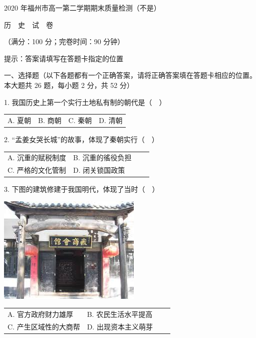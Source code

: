 \documentclass{ctexart}
\begin{document}
\begin{center}

\LARGE 2020 年福州市高一第二学期期末质量检测（不是）

\Huge \textsf{历　史　试　卷}

\bigskip

\normalsize（满分：100 分；完卷时间：90 分钟）

\medskip

\large \textsf{提示：答案请填写在答题卡指定的位置}

\end{center}

\textsf{一、选择题（以下各题都有一个正确答案，请将正确答案填在答题卡相应的位置。本大题共 26 题，每小题 2 分，共 52 分）}

1. 我国历史上第一个实行土地私有制的朝代是（　）

\begin{tabularx}{\linewidth}{XXXX}

A. 夏朝 &
B. 商朝 &
C. 秦朝 &
D. 清朝

\end{tabularx}

2. “孟姜女哭长城”的故事，体现了秦朝实行（　）

\begin{tabularx}{\linewidth}{XXXX}

A. 沉重的赋税制度 &
B. 沉重的徭役负担 \\
C. 严格的文化管制 &
D. 闭关锁国政策

\end{tabularx}

3. 下图的建筑修建于我国明代，体现了当时（　）

\begin{center}

\includegraphics[scale=0.5]{3}

\end{center}

\begin{tabularx}{\linewidth}{XXXX}

A. 官方政府财力雄厚 &
B. 农民生活水平提高 \\
C. 产生区域性的大商帮 &
D. 出现资本主义萌芽

\end{tabularx}
\end{document}
